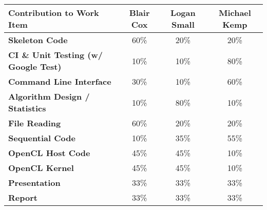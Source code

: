 \vspace{-1.2cm}

\begin{center}
   \begin{tabular}{>{\bfseries}l| c c c}
     Contribution to Work Item & \textbf{Blair Cox} & \textbf{Logan Small} & \textbf{Michael Kemp} \\ 
     \hline
     Skeleton Code & 60\% & 20\% & 20\% \\
     CI \& Unit Testing (w/ Google Test) & 10\% & 10\% & 80\% \\
     Command Line Interface & 30\% & 10\% & 60\% \\
     Algorithm Design / Statistics & 10\% & 80\% & 10\% \\
     File Reading & 60\% & 20\% & 20\% \\
     Sequential Code & 10\% & 35\% & 55\% \\
     OpenCL Host Code & 45\% & 45\% & 10\% \\
     OpenCL Kernel & 45\% & 45\% & 10\% \\
     Presentation & 33\% & 33\% & 33\% \\
     Report & 33\% & 33\% & 33\% \\
   \end{tabular}
\end{center}
